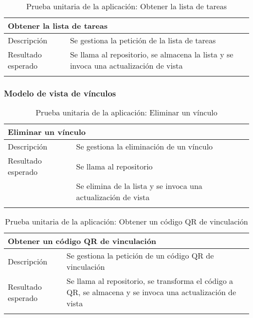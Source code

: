 \vspace{-15pt}
\begin{longtable}{|p{} p{}|}
    \hline
    \multicolumn{2}{|l|}{\textbf{Obtener la lista de tareas}} \\ \hline 
    Descripción                 & Se gestiona la petición de la lista de tareas \\ \hline
    Resultado esperado          & Se llama al repositorio, se almacena la lista y se invoca una actualización de vista \\ \hline
    \caption{Prueba unitaria de la aplicación: Obtener la lista de tareas}
    \label{cp:u:app:obtener_lista_tareas}
\end{longtable}
    
\vspace{-15pt}
\subsubsection{Modelo de vista de vínculos}

\begin{longtable}{|p{} p{}|}
    \hline
    \multicolumn{2}{|l|}{\textbf{Eliminar un vínculo}} \\ \hline 
    Descripción                 & Se gestiona la eliminación de un vínculo \\ \hline
    Resultado esperado          & Se llama al repositorio \\
                                & Se elimina de la lista y se invoca una actualización de vista \\ \hline
    \caption{Prueba unitaria de la aplicación: Eliminar un vínculo}
    \label{cp:u:app:eliminar_vinculo_vista}
\end{longtable}

\vspace{-15pt}
\begin{longtable}{|p{} p{}|}
    \hline
    \multicolumn{2}{|l|}{\textbf{Obtener un código QR de vinculación}} \\ \hline 
    Descripción                 & Se gestiona la petición de un código QR de vinculación \\ \hline
    Resultado esperado          & Se llama al repositorio, se transforma el código a QR, se almacena y se invoca una actualización de vista \\ \hline
    \caption{Prueba unitaria de la aplicación: Obtener un código QR de vinculación}
    \label{cp:u:app:obtener_codigo_qr_vinculacion}
\end{longtable}

